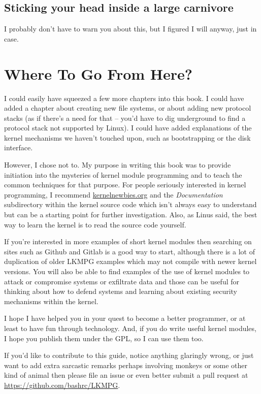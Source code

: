 \documentclass[11pt]{article}
\begin{document}
\subsection*{Sticking your head inside a large carnivore}
\label{sec-19-3}
I probably don't have to warn you about this, but I figured I will anyway, just in case.

\section*{Where To Go From Here?}
\label{sec-20}
I could easily have squeezed a few more chapters into this book. I could have added a chapter about creating new file systems, or about adding new protocol stacks (as if there's a need for that -- you'd have to dig underground to find a protocol stack not supported by Linux). I could have added explanations of the kernel mechanisms we haven't touched upon, such as bootstrapping or the disk interface.

However, I chose not to. My purpose in writing this book was to provide initiation into the mysteries of kernel module programming and to teach the common techniques for that purpose. For people seriously interested in kernel programming, I recommend \href{https://kernelnewbies.org}{kernelnewbies.org} and the \emph{Documentation} subdirectory within the kernel source code which isn't always easy to understand but can be a starting point for further investigation. Also, as Linus said, the best way to learn the kernel is to read the source code yourself.

If you're interested in more examples of short kernel modules then searching on sites such as Github and Gitlab is a good way to start, although there is a lot of duplication of older LKMPG examples which may not compile with newer kernel versions. You will also be able to find examples of the use of kernel modules to attack or compromise systems or exfiltrate data and those can be useful for thinking about how to defend systems and learning about existing security mechanisms within the kernel.

I hope I have helped you in your quest to become a better programmer, or at least to have fun through technology. And, if you do write useful kernel modules, I hope you publish them under the GPL, so I can use them too.

If you'd like to contribute to this guide, notice anything glaringly wrong, or just want to add extra sarcastic remarks perhaps involving monkeys or some other kind of animal then please file an issue or even better submit a pull request at \url{https://github.com/bashrc/LKMPG}.
\end{document}
